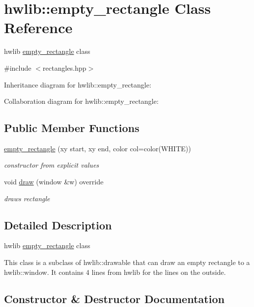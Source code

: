 \hypertarget{classhwlib_1_1empty__rectangle}{}\section{hwlib\+:\+:empty\+\_\+rectangle Class Reference}
\label{classhwlib_1_1empty__rectangle}


hwlib \hyperlink{classhwlib_1_1empty__rectangle}{empty\+\_\+rectangle} class  




{\ttfamily \#include $<$rectangles.\+hpp$>$}



Inheritance diagram for hwlib\+:\+:empty\+\_\+rectangle\+:


Collaboration diagram for hwlib\+:\+:empty\+\_\+rectangle\+:
\subsection*{Public Member Functions}
\begin{DoxyCompactItemize}
\item 
\hyperlink{classhwlib_1_1empty__rectangle_a447ebddbb583465c92ec40226c1c7685}{empty\+\_\+rectangle} (xy start, xy end, color col=color(W\+H\+I\+TE))
\begin{DoxyCompactList}\small\item\em constructor from explicit values \end{DoxyCompactList}\item 
void \hyperlink{classhwlib_1_1empty__rectangle_a1704fd030928cd7929bc1d2300e3ea43}{draw} (window \&w) override
\begin{DoxyCompactList}\small\item\em draws rectangle \end{DoxyCompactList}\end{DoxyCompactItemize}


\subsection{Detailed Description}
hwlib \hyperlink{classhwlib_1_1empty__rectangle}{empty\+\_\+rectangle} class 

This class is a subclass of hwlib\+::drawable that can draw an empty rectangle to a hwlib\+::window. It contains 4 lines from hwlib for the lines on the outside. 

\subsection{Constructor \& Destructor Documentation}
\mbox{\label{classhwlib_1_1empty__rectangle_a447ebddbb583465c92ec40226c1c7685}} 
